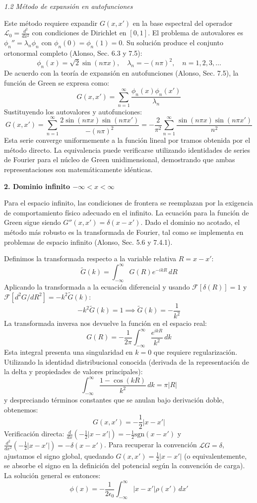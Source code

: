 \documentclass[a4paper]{article}
\begin{document}
\textit{1.2 Método de expansión en autofunciones}

Este método requiere expandir $G(x,x')$ en la base espectral del operador $\mathscr{L}_0 = \frac{d^2}{dx^2}$ con condiciones de Dirichlet en $[0,1]$. El problema de autovalores es $\phi_n'' = \lambda_n \phi_n$ con $\phi_n(0)=\phi_n(1)=0$. Su solución produce el conjunto ortonormal completo (Alonso, Sec. 6.3 y 7.5):
$$ \phi_n(x) = \sqrt{2} \sin(n\pi x), \quad \lambda_n = -(n\pi)^2, \quad n = 1, 2, 3, \dots $$
De acuerdo con la teoría de expansión en autofunciones (Alonso, Sec. 7.5), la función de Green se expresa como:
$$ G(x,x') = \sum_{n=1}^\infty \frac{\phi_n(x)\phi_n(x')}{\lambda_n} $$
Sustituyendo los autovalores y autofunciones:
$$ G(x,x') = \sum_{n=1}^\infty \frac{2\sin(n\pi x)\sin(n\pi x')}{-(n\pi)^2} = -\frac{2}{\pi^2} \sum_{n=1}^\infty \frac{\sin(n\pi x)\sin(n\pi x')}{n^2} $$
Esta serie converge uniformemente a la función lineal por tramos obtenida por el método directo. La equivalencia puede verificarse utilizando identidades de series de Fourier para el núcleo de Green unidimensional, demostrando que ambas representaciones son matemáticamente idénticas.

\textbf{2. Dominio infinito $-\infty < x < \infty$}

Para el espacio infinito, las condiciones de frontera se reemplazan por la exigencia de comportamiento físico adecuado en el infinito. La ecuación para la función de Green sigue siendo $G''(x,x') = \delta(x-x')$. Dado el dominio no acotado, el método más robusto es la transformada de Fourier, tal como se implementa en problemas de espacio infinito (Alonso, Sec. 5.6 y 7.4.1).

Definimos la transformada respecto a la variable relativa $R = x-x'$:
$$ \tilde{G}(k) = \int_{-\infty}^\infty G(R) e^{-ikR} \, dR $$
Aplicando la transformada a la ecuación diferencial y usando $\mathcal{F}[\delta(R)] = 1$ y $\mathcal{F}[d^2G/dR^2] = -k^2\tilde{G}(k)$:
$$ -k^2 \tilde{G}(k) = 1 \implies \tilde{G}(k) = -\frac{1}{k^2} $$
La transformada inversa nos devuelve la función en el espacio real:
$$ G(R) = -\frac{1}{2\pi} \int_{-\infty}^\infty \frac{e^{ikR}}{k^2} \, dk $$
Esta integral presenta una singularidad en $k=0$ que requiere regularización. Utilizando la identidad distribucional conocida (derivada de la representación de la delta y propiedades de valores principales):
$$ \int_{-\infty}^\infty \frac{1-\cos(kR)}{k^2} \, dk = \pi |R| $$
y despreciando términos constantes que se anulan bajo derivación doble, obtenemos:
$$ G(x,x') = -\frac{1}{2} |x-x'| $$
Verificación directa: $\frac{d}{dx}(-\frac{1}{2}|x-x'|) = -\frac{1}{2}\text{sgn}(x-x')$ y $\frac{d^2}{dx^2}(-\frac{1}{2}|x-x'|) = -\delta(x-x')$. Para recuperar la convención $\mathscr{L}G = \delta$, ajustamos el signo global, quedando $G(x,x') = \frac{1}{2}|x-x'|$ (o equivalentemente, se absorbe el signo en la definición del potencial según la convención de carga). La solución general es entonces:
$$ \phi(x) = -\frac{1}{2\epsilon_0} \int_{-\infty}^\infty |x-x'| \rho(x') \, dx' $$
\end{document}
